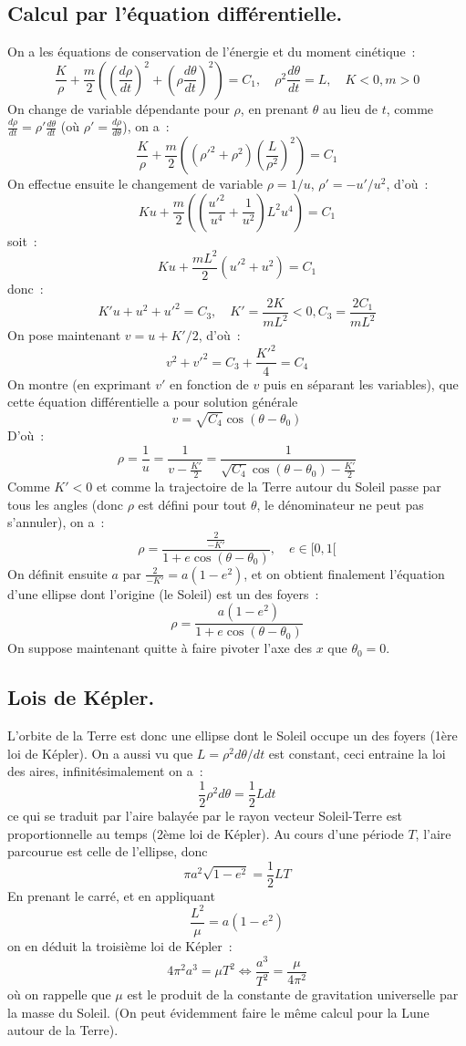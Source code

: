 \documentclass[a4paper,11pt]{book}
\begin{document}
\begin{giacjshere}
\subsection{Calcul par l'\'equation diff\'erentielle.}
On a les équations de conservation de l'\'energie et du moment cin\'etique~:
\[ \frac{K}{\rho}+\frac{m}{2} \left( \left(\frac{d\rho}{dt}\right)^2
+ \left(\rho \frac{d\theta}{dt} \right)^2 \right)
=C_1, \quad \rho^2 \frac{d\theta}{dt} = L, \quad K<0, m>0
\]
On change de variable dépendante pour $\rho$, 
en prenant $\theta$ au lieu de $t$,
comme $\frac{d\rho}{dt}=\rho' \frac{d\theta}{dt}$ 
(où $\rho'=\frac{d\rho}{d\theta}$), on a~:
\[
 \frac{K}{\rho}+\frac{m}{2}\left( (\rho'^2+\rho^2) 
\left(\frac{L}{\rho^2}\right)^2 \right) = C_1
\]
On effectue ensuite le changement de variable $\rho=1/u$, $\rho'=-u'/ u^2$,
d'où~:
\[
K u + \frac{m}{2} \left( 
\left(\frac{u'^2 }{u^4}+\frac{1}{u^2}\right) L^2 u^4 \right)
= C_1
\]
soit~:
\[ K u + \frac{mL^2}{2} ( u'^2+u^2) = C_1 \]
donc~:
\[ K' u + u^2 + u'^2 = C_3, \quad 
K'=\frac{2K}{mL^2} <0, C_3=\frac{2C_1}{mL^2}
\]
On pose maintenant $v=u+K'/2$, d'où~:
\[ v^2 + v'^2 = C_3 + \frac{K'^2}{4} = C_4 \]
On montre (en exprimant $v'$ en fonction de $v$ puis en séparant les
variables), que cette équation différentielle a pour solution générale
\[ v= \sqrt{C_4} \cos(\theta-\theta_0) \]
D'où~:
\[ \rho = \frac{1}{u} =
\frac{1}{v-\frac{K'}{2}} = 
\frac{1}{\sqrt{C_4} \cos(\theta-\theta_0)-\frac{K'}{2}}
\]
Comme $K'<0$ et comme la trajectoire de la Terre autour du Soleil
passe par tous les angles (donc $\rho$ est défini pour tout $\theta$,
le dénominateur ne peut pas s'annuler), on a~:
\[ \rho = \frac{\frac{2}{-K'}}{1+e \cos(\theta-\theta_0)}, \quad e \in [0,1[ \]
On définit ensuite $a$ par $\frac{2}{-K'}=a(1-e^2)$, et on obtient finalement
l'équation d'une ellipse dont l'origine (le Soleil) est un des
foyers~:
\[  \rho = \frac{a(1-e^2)}{1+e \cos(\theta-\theta_0)} \]
On suppose maintenant quitte à faire pivoter l'axe des $x$ que
$\theta_0=0$.

\subsection{Lois de K\'epler.}
L'orbite de la Terre est donc une ellipse dont le Soleil occupe un des foyers
(1\`ere loi de K\'epler).
On a aussi vu que $L=\rho^2 d\theta/dt$ est constant, ceci entraine la loi
des aires, infinit\'esimalement on a~:
\[ \frac{1}{2}\rho^2 d\theta = \frac{1}{2} L dt \]
ce qui se traduit par
l'aire balay\'ee par le rayon vecteur Soleil-Terre est proportionnelle
au temps (2\`eme loi de K\'epler). 
Au cours d'une p\'eriode $T$, l'aire parcourue est celle
de l'ellipse, donc 
\[ \pi a^2 \sqrt{1-e^2}=\frac{1}{2}LT \]
En prenant le carr\'e, et en appliquant
\[ \frac{L^2}{\mu}= a(1-e^2)\]
on en d\'eduit la troisi\`eme loi de K\'epler~:
\[ 4\pi^2 a^3 = \mu T^2 \Leftrightarrow \frac{a^3}{T^2} = \frac{\mu}{4\pi^2} \]
o\`u on rappelle que $\mu$ est le produit de la constante de gravitation
universelle par la masse du Soleil. (On peut \'evidemment faire
le m\^eme calcul pour la Lune autour de la Terre).


\end{giacjshere}
\end{document}
